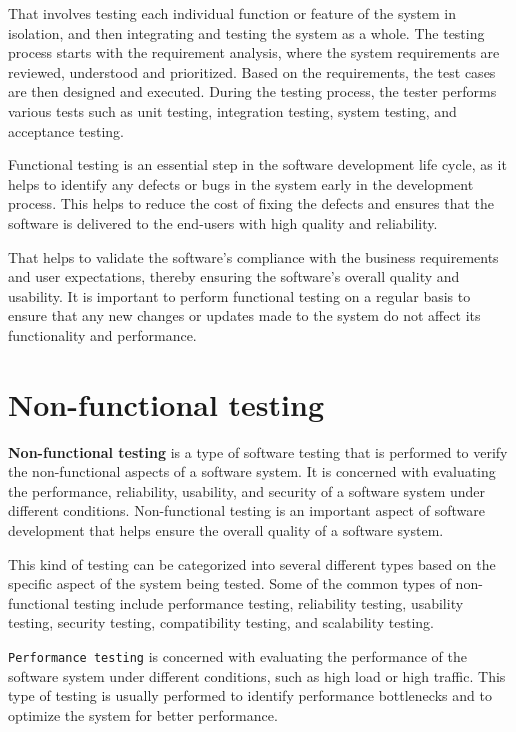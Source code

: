 That involves testing each individual function or feature of the system in isolation, and then 
integrating and testing the system as a whole. The testing process starts with the requirement analysis, 
where the system requirements are reviewed, understood and prioritized. Based on the requirements, 
the test cases are then designed and executed. During the testing process, the tester performs 
various tests such as unit testing, integration testing, system testing, and acceptance testing.

Functional testing is an essential step in the software development life cycle, as it helps to 
identify any defects or bugs in the system early in the development process. This helps to 
reduce the cost of fixing the defects and ensures that the software is delivered to the 
end-users with high quality and reliability.

That helps to validate the software's compliance with the business requirements 
and user expectations, thereby ensuring the software's overall quality and usability. 
It is important to perform functional testing on a regular basis to ensure that 
any new changes or updates made to the system do not affect its functionality and performance.


\section{Non-functional testing}
\textbf{Non-functional testing} is a type of software testing that is performed to verify the non-functional aspects of a software system. 
It is concerned with evaluating the performance, reliability, usability, and security of a software system under different conditions. 
Non-functional testing is an important aspect of software development that helps ensure the overall quality of a software system.

This kind of testing can be categorized into several different types based on the specific aspect of the system being tested. 
Some of the common types of non-functional testing include performance testing, reliability testing, usability testing, 
security testing, compatibility testing, and scalability testing.

\texttt{Performance testing} is concerned with evaluating the performance of the software system under different conditions, 
such as high load or high traffic. This type of testing is usually performed to identify performance bottlenecks and 
to optimize the system for better performance.

